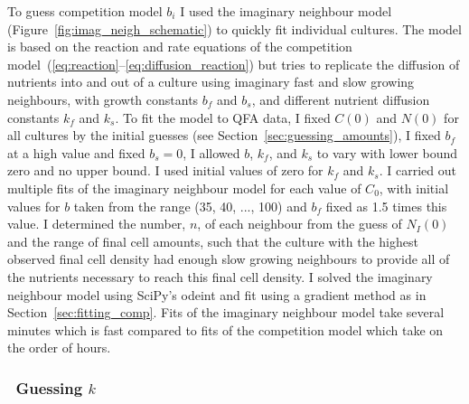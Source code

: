 
To guess competition model \(b_{i}\) I used the imaginary neighbour
model (Figure~\ref{fig:imag_neigh_schematic}) to quickly fit
individual cultures. The model is based on the reaction and rate
equations of the competition
model~(\ref{eq:reaction}--\ref{eq:diffusion_reaction}) but tries to
replicate the diffusion of nutrients into and out of a culture using
imaginary fast and slow growing neighbours, with growth constants
\(b_{f}\) and \(b_{s}\), and different nutrient diffusion constants
\(k_{f}\) and \(k_{s}\). To fit the model to QFA data, I fixed
\(C(0)\) and \(N(0)\) for all cultures by the initial guesses (see
Section~\ref{sec:guessing_amounts}), I fixed \(b_{f}\) at a high value
and fixed \(b_{s} = 0\), I allowed \(b\), \(k_{f}\), and \(k_{s}\) to
vary with lower bound zero and no upper bound. I used initial values
of zero for \(k_{f}\) and \(k_{s}\). I carried out multiple fits of
the imaginary neighbour model for each value of \(C_{0}\), with
initial values for \(b\) taken from the range (35, 40, ..., 100) and
\(b_{f}\) fixed as 1.5 times this value. I determined the number,
\(n\), of each neighbour from the guess of \(N_{I}(0)\) and the range
of final cell amounts, such that the culture with the highest observed
final cell density had enough slow growing neighbours to provide all
of the nutrients necessary to reach this final cell density. I solved
the imaginary neighbour model using SciPy's odeint and fit using a
gradient method as in Section~\ref{sec:fitting_comp}. Fits of the
imaginary neighbour model take several minutes which is fast compared
to fits of the competition model which take on the order of hours.


\subsubsection{\boldmath \thesubsubsection~Guessing \(k\) \unboldmath}

